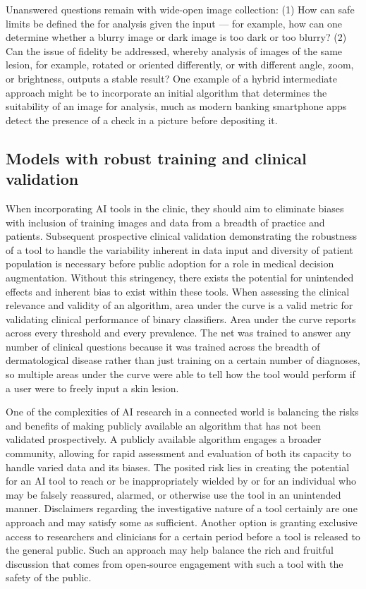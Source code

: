 Unanswered questions remain with wide-open image collection: (1) How can safe limits be defined the for analysis given the input — for example, how can one determine whether a blurry image or dark image is too dark or too blurry? (2) Can the issue of fidelity be addressed, whereby analysis of images of the same lesion, for example, rotated or oriented differently, or with different angle, zoom, or brightness, outputs a stable result? One example of a hybrid intermediate approach might be to incorporate an initial algorithm that determines the suitability of an image for analysis, much as modern banking smartphone apps detect the presence of a check in a picture before depositing it.

\subsection{Models with robust training and clinical validation}
When incorporating AI tools in the clinic, they should aim to eliminate biases with inclusion of training images and data from a breadth of practice and patients. Subsequent prospective clinical validation demonstrating the robustness of a tool to handle the variability inherent in data input and diversity of patient population is necessary before public adoption for a role in medical decision augmentation. Without this stringency, there exists the potential for unintended effects and inherent bias to exist within these tools. When assessing the clinical relevance and validity of an algorithm, area under the curve is a valid metric for validating clinical performance of binary classifiers. Area under the curve reports across every threshold and every prevalence. The net was trained to answer any number of clinical questions because it was trained across the breadth of dermatological disease rather than just training on a certain number of diagnoses, so multiple areas under the curve were able to tell how the tool would perform if a user were to freely input a skin lesion.

One of the complexities of AI research in a connected world is balancing the risks and benefits of making publicly available an algorithm that has not been validated prospectively. A publicly available algorithm engages a broader community, allowing for rapid assessment and evaluation of both its capacity to handle varied data and its biases. The posited risk lies in creating the potential for an AI tool to reach or be inappropriately wielded by or for an individual who may be falsely reassured, alarmed, or otherwise use the tool in an unintended manner. Disclaimers regarding the investigative nature of a tool certainly are one approach and may satisfy some as sufficient. Another option is granting exclusive access to researchers and clinicians for a certain period before a tool is released to the general public. Such an approach may help balance the rich and fruitful discussion that comes from open-source engagement with such a tool with the safety of the public.

